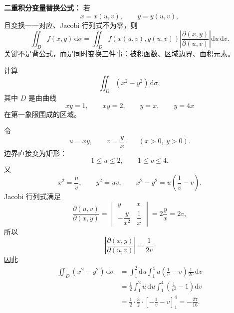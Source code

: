 \documentclass[answer,fontset=fandol]{THUExam}
\begin{document}
\newpage
{}

\begin{note}
\textbf{二重积分变量替换公式：} 若
\[
x=x(u,v),\qquad y=y(u,v),
\]
且变换一一对应、Jacobi 行列式不为零，则
\[
\iint_D f(x,y)\,\mathrm{d}\sigma
=\iint_{\widetilde D} f(x(u,v),y(u,v))
\left|\frac{\partial(x,y)}{\partial(u,v)}\right|
\mathrm{d}u\,\mathrm{d}v.
\]
关键不是背公式，而是同时变换三件事：被积函数、区域边界、面积元素。
\end{note}
\bigskip

\begin{problem}
计算
\[
\iint_D (x^2-y^2)\,\mathrm{d}\sigma,
\]
其中 $D$ 是由曲线
\[
xy=1,\qquad xy=2,\qquad y=x,\qquad y=4x
\]
在第一象限围成的区域。

\begin{center}
\end{center}
\end{problem}
\begin{solution}
令
\[
u=xy,\qquad v=\frac{y}{x}\qquad(x>0,\ y>0).
\]
边界直接变为矩形：
\[
1\leqslant u\leqslant2,\qquad 1\leqslant v\leqslant4.
\]
又
\[
x^2=\frac{u}{v},\qquad y^2=uv,\qquad
x^2-y^2=u\left(\frac1v-v\right).
\]
Jacobi 行列式满足
\[
\frac{\partial(u,v)}{\partial(x,y)}
=
\begin{vmatrix}
y & x\\[2pt]
-\dfrac{y}{x^2} & \dfrac1x
\end{vmatrix}
=2\frac{y}{x}=2v,
\]
所以
\[
\left|\frac{\partial(x,y)}{\partial(u,v)}\right|=\frac{1}{2v}.
\]
因此
\begin{align*}
\iint_D(x^2-y^2)\,\mathrm{d}\sigma
&=\int_1^2\mathrm{d}u\int_1^4
u\left(\frac1v-v\right)\frac{1}{2v}\,\mathrm{d}v\\
&=\frac12\int_1^2u\,\mathrm{d}u
\int_1^4\left(\frac1{v^2}-1\right)\mathrm{d}v\\
&=\frac12\cdot\frac32\cdot
\left[-\frac1v-v\right]_1^4
=\boxed{-\frac{27}{16}}.
\end{align*}
\end{solution}
\bigskip
\end{document}
